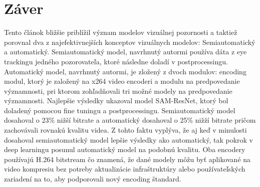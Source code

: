 \documentclass[10pt,twoside,slovak,a4paper]{article}
\begin{document}
\section{Záver} \label{zaver} 
Tento článok bližšie priblížil význam modelov vizuálnej pozornosti a taktiež porovnal dva z najefektivnejších konceptov vizuálnych modelov: Semiautomatický a automatický. Semiautomatický model, navrhnutý autormi\cite{Coplien:MPD} používa dáta z eye trackingu jedného pozorovateľa, ktoré následne doladí v postprocessingu. Automatický model, navrhnutý autormi\cite{Czarnecki:Progress}, je zložený z dvoch modulov: encoding modul, ktorý je založený na x264 video encoderi a modulu na predpovedanie významnosti, pri ktorom zohľadňovali tri možné modely na predpovedanie významnosti. Najlepšie výsledky ukazoval model SAM-ResNet, ktorý bol doladený pomocou fine tuningu a postprocessingu. Semiautomatický model dosahoval o 23\% nižší bitrate a automatický dosahoval o 25\% nižží bitrate pričom zachovávali rovnakú kvalitu videa. Z tohto faktu vyplýva, že aj keď v minulosti dosahoval semiautomatický model lepšie výsledky ako automatický, tak pokrok v deep learningu posunul automatický model na podobnú kvalitu. Oba encodery používajú H.264 bitstream čo znamená, že dané modely môžu byť aplikované na video kompresiu bez potreby aktualizácie infraštruktúry alebo používateľských zariadení na to, aby podporovali nový encoding štandard.


\end{document}
